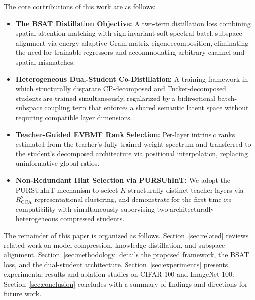 \documentclass[conference]{IEEEtran}
\begin{document}
\par
The core contributions of this work are as follows:
\begin{itemize}
    \item \textbf{The BSAT Distillation Objective:} A two-term distillation
    loss combining spatial attention matching with sign-invariant soft spectral
    batch-subspace alignment via energy-adaptive Gram-matrix eigendecomposition,
    eliminating the need for trainable regressors and accommodating arbitrary
    channel and spatial mismatches.

    \item \textbf{Heterogeneous Dual-Student Co-Distillation:} A training
    framework in which structurally disparate CP-decomposed and
    Tucker-decomposed students are trained simultaneously, regularized by a
    bidirectional batch-subspace coupling term that enforces a shared semantic
    latent space without requiring compatible layer dimensions.

    \item \textbf{Teacher-Guided EVBMF Rank Selection:} Per-layer intrinsic
    ranks estimated from the teacher's fully-trained weight spectrum and
    transferred to the student's decomposed architecture via positional
    interpolation, replacing uninformative global ratios.

    \item \textbf{Non-Redundant Hint Selection via PURSUhInT:} 
    We adopt the PURSUhInT mechanism to select $K$ structurally distinct
    teacher layers via $R^2_\text{CCA}$ representational clustering, and
    demonstrate for the first time its compatibility with simultaneously
    supervising two architecturally heterogeneous compressed students.
\end{itemize}

\par
The remainder of this paper is organized as follows. Section~\ref{sec:related}
reviews related work on model compression, knowledge distillation, and
subspace alignment. Section~\ref{sec:methodology} details the proposed framework,
the BSAT loss, and the dual-student architecture. Section~\ref{sec:experiments}
presents experimental results and ablation studies on CIFAR-100 and
ImageNet-100. Section~\ref{sec:conclusion} concludes with a summary of
findings and directions for future work.




\end{document}
